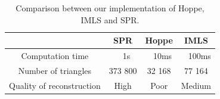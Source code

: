 \documentclass[a4paper]{article}
\begin{document}
\begin{table}
    \centering
    \begin{tabular}{|c|c|c|c|}
      \hline
         & SPR & Hoppe & IMLS\\
      \hline
      Computation time & ~ 1s & ~ 10ms & ~ 100ms\\
      Number of triangles & 373 800 & 32 168 & 77 164\\
      Quality of reconstruction & High & Poor & Medium\\
      \hline
    \end{tabular}
    \caption{Comparison between our implementation of Hoppe, IMLS and SPR.}
    \label{tab:IMLSTable}
  \end{table}
\end{document}
